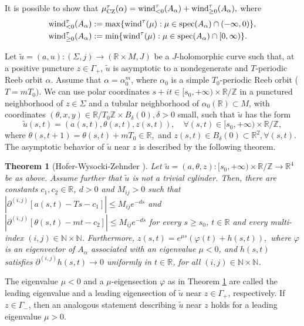 \documentclass{amsart}
\newcommand{\R}{\mathbb{R}}
\newcommand{\Z}{\mathbb{Z}}
\newcommand{\N}{\mathbb{N}}
\newtheorem{theorem}{Theorem}[section]
\newcommand{\wind}{\text{wind}^{\tau}}
\begin{document}
It is possible to show that
$
\mu_{\rm CZ}^\tau(\alpha) = \wind_{<0}(A_\alpha) + \wind_{\geq 0}(A_\alpha),
$
where
$$
\begin{aligned}
\wind_{<0}(A_\alpha) & := \max \{\wind(\mu): \mu \in {\rm spec}(A_\alpha) \cap (-\infty,0)\},\\
\wind_{\geq 0}(A_\alpha) & := \min \{\wind(\mu): \mu \in {\rm spec}(A_\alpha) \cap [0,\infty)\}.
\end{aligned}
$$



Let $\tilde u=(a,u):(\Sigma,j) \to (\R \times M,J)$ be a $J$-holomorphic curve such that, at a positive puncture $z \in \Gamma_+$, $\tilde u$ is asymptotic to a nondegenerate and $T$-periodic Reeb orbit $\alpha$. Assume that $\alpha=\alpha_0^m$, where $\alpha_0$ is a simple $T_0$-periodic Reeb orbit ($T=mT_0)$. We can use polar coordinates $s+it \in [s_0,+\infty) \times \R / \Z$ in a punctured neighborhood of $z \in \Sigma$ and a tubular neighborhood of $\alpha_0(\R) \subset M$, with coordinates $(\theta,x,y)\in \R / T_0\Z \times B_\delta(0), \delta>0$ small, such that $\tilde u$ has the form
$$\tilde u(s,t)=(a(s,t),\theta(s,t),z(s,t)), \quad \forall (s,t) \in [s_0,+\infty) \times \R / \Z,$$
where $\theta(s,t+1)=\theta(s,t) +mT_0 \in \R,$ and $z(s,t) \in B_\delta(0) \subset \R^2 , \forall (s,t)$.
The asymptotic behavior of $\tilde u$ near $z$ is described by the following theorem. 

\begin{theorem}[Hofer-Wysocki-Zehnder \cite{prop1}] \label{reprass}
Let $\widetilde{u}=(a,\theta,z):[s_0,+\infty)\times \R/\Z \to \R^4$ be  as above. Assume further that $\widetilde{u}$ is not a trivial cylinder. Then, there are constants $c_1,c_2 \in \R$, $d>0$ and $M_{ij}>0$ such that
$
|\partial^{(i,j)}[a(s,t)-Ts-c_1]| \leq M_{ij}e^{-ds}$ and $
|\partial^{(i,j)}[\theta(s,t)-mt-c_2]| \leq M_{ij}e^{-ds}
$
for every $s \geq s_0$, $t \in \R$ and every multi-index $(i,j) \in \N \times \N$. Furthermore,
$
z(s,t)=e^{\mu s}(\varphi(t)+h(s,t)),
$
where $\varphi$ is an eigenvector of  $A_{\alpha}$ associated with an eigenvalue $\mu<0$, and $h(s,t)$ satisfies
$\partial^{(i,j)}h(s,t) \to 0$
uniformly in $t \in \R$, for all $(i,j) \in \N \times \N$. 
\end{theorem}

The eigenvalue $\mu<0$ and a $\mu$-eigensection $\varphi$ as in Theorem \ref{reprass} are called the leading eigenvalue and a leading eigensection of $\tilde u$ near $z\in \Gamma_+$, respectively. If $z\in \Gamma_-$, then an analogous statement describing $\tilde u$ near $z$ holds for a leading eigenvalue $\mu>0$. 
\end{document}
